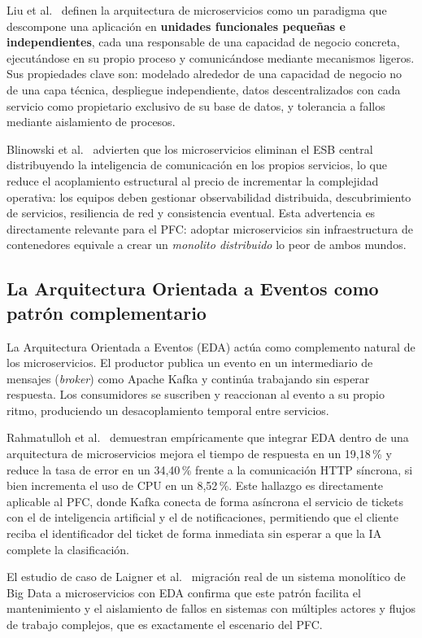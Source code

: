\documentclass[12pt, a4paper]{article}
\begin{document}
Liu et al.~\cite{liu2020} definen la arquitectura de microservicios como un
paradigma que descompone una aplicación en \textbf{unidades funcionales pequeñas
e independientes}, cada una responsable de una capacidad de negocio concreta,
ejecutándose en su propio proceso y comunicándose mediante mecanismos ligeros.
Sus propiedades clave son: modelado alrededor de una capacidad de negocio no de
una capa técnica, despliegue independiente, datos descentralizados con cada
servicio como propietario exclusivo de su base de datos, y tolerancia a fallos
mediante aislamiento de procesos.

Blinowski et al.~\cite{blinowski2022} advierten que los microservicios eliminan el
ESB central distribuyendo la inteligencia de comunicación en los propios servicios,
lo que reduce el acoplamiento estructural al precio de incrementar la complejidad
operativa: los equipos deben gestionar observabilidad distribuida, descubrimiento
de servicios, resiliencia de red y consistencia eventual. Esta advertencia es
directamente relevante para el PFC: adoptar microservicios sin infraestructura
de contenedores equivale a crear un \textit{monolito distribuido} lo peor de
ambos mundos.

\subsection{La Arquitectura Orientada a Eventos como patrón complementario}

La Arquitectura Orientada a Eventos (EDA) actúa como complemento natural de los
microservicios. El productor publica un evento en un intermediario de mensajes
(\textit{broker}) como Apache Kafka y continúa trabajando sin esperar respuesta.
Los consumidores se suscriben y reaccionan al evento a su propio ritmo, produciendo
un desacoplamiento temporal entre servicios.

Rahmatulloh et al.~\cite{rahmatulloh2022} demuestran empíricamente que integrar
EDA dentro de una arquitectura de microservicios mejora el tiempo de respuesta en
un 19{,}18\,\% y reduce la tasa de error en un 34{,}40\,\% frente a la
comunicación HTTP síncrona, si bien incrementa el uso de CPU en un 8{,}52\,\%.
Este hallazgo es directamente aplicable al PFC, donde Kafka conecta de forma
asíncrona el servicio de tickets con el de inteligencia artificial y el de
notificaciones, permitiendo que el cliente reciba el identificador del ticket de
forma inmediata sin esperar a que la IA complete la clasificación.

El estudio de caso de Laigner et al.~\cite{laigner2020} migración real de un
sistema monolítico de Big Data a microservicios con EDA confirma que este patrón
facilita el mantenimiento y el aislamiento de fallos en sistemas con múltiples
actores y flujos de trabajo complejos, que es exactamente el escenario del PFC.
\end{document}
